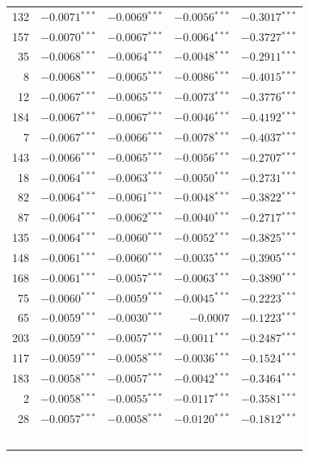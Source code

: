 \documentclass[review,authoryear]{elsarticle}
\begin{document}
\begin{longtable}{rrrrr}
132 & $-0.0071$$^{***}$ & $-0.0069$$^{***}$ & $-0.0056$$^{***}$ & $-0.3017$$^{***}$ \\
157 & $-0.0070$$^{***}$ & $-0.0067$$^{***}$ & $-0.0064$$^{***}$ & $-0.3727$$^{***}$ \\
35 & $-0.0068$$^{***}$ & $-0.0064$$^{***}$ & $-0.0048$$^{***}$ & $-0.2911$$^{***}$ \\
8 & $-0.0068$$^{***}$ & $-0.0065$$^{***}$ & $-0.0086$$^{***}$ & $-0.4015$$^{***}$ \\
12 & $-0.0067$$^{***}$ & $-0.0065$$^{***}$ & $-0.0073$$^{***}$ & $-0.3776$$^{***}$ \\
184 & $-0.0067$$^{***}$ & $-0.0067$$^{***}$ & $-0.0046$$^{***}$ & $-0.4192$$^{***}$ \\
7 & $-0.0067$$^{***}$ & $-0.0066$$^{***}$ & $-0.0078$$^{***}$ & $-0.4037$$^{***}$ \\
143 & $-0.0066$$^{***}$ & $-0.0065$$^{***}$ & $-0.0056$$^{***}$ & $-0.2707$$^{***}$ \\
18 & $-0.0064$$^{***}$ & $-0.0063$$^{***}$ & $-0.0050$$^{***}$ & $-0.2731$$^{***}$ \\
82 & $-0.0064$$^{***}$ & $-0.0061$$^{***}$ & $-0.0048$$^{***}$ & $-0.3822$$^{***}$ \\
87 & $-0.0064$$^{***}$ & $-0.0062$$^{***}$ & $-0.0040$$^{***}$ & $-0.2717$$^{***}$ \\
135 & $-0.0064$$^{***}$ & $-0.0060$$^{***}$ & $-0.0052$$^{***}$ & $-0.3825$$^{***}$ \\
148 & $-0.0061$$^{***}$ & $-0.0060$$^{***}$ & $-0.0035$$^{***}$ & $-0.3905$$^{***}$ \\
168 & $-0.0061$$^{***}$ & $-0.0057$$^{***}$ & $-0.0063$$^{***}$ & $-0.3890$$^{***}$ \\
75 & $-0.0060$$^{***}$ & $-0.0059$$^{***}$ & $-0.0045$$^{***}$ & $-0.2223$$^{***}$ \\
65 & $-0.0059$$^{***}$ & $-0.0030$$^{***}$ & $-0.0007$ & $-0.1223$$^{***}$ \\
203 & $-0.0059$$^{***}$ & $-0.0057$$^{***}$ & $-0.0011$$^{***}$ & $-0.2487$$^{***}$ \\
117 & $-0.0059$$^{***}$ & $-0.0058$$^{***}$ & $-0.0036$$^{***}$ & $-0.1524$$^{***}$ \\
183 & $-0.0058$$^{***}$ & $-0.0057$$^{***}$ & $-0.0042$$^{***}$ & $-0.3464$$^{***}$ \\
2 & $-0.0058$$^{***}$ & $-0.0055$$^{***}$ & $-0.0117$$^{***}$ & $-0.3581$$^{***}$ \\
28 & $-0.0057$$^{***}$ & $-0.0058$$^{***}$ & $-0.0120$$^{***}$ & $-0.1812$$^{***}$ \\
$$
\end{longtable}
\end{document}
